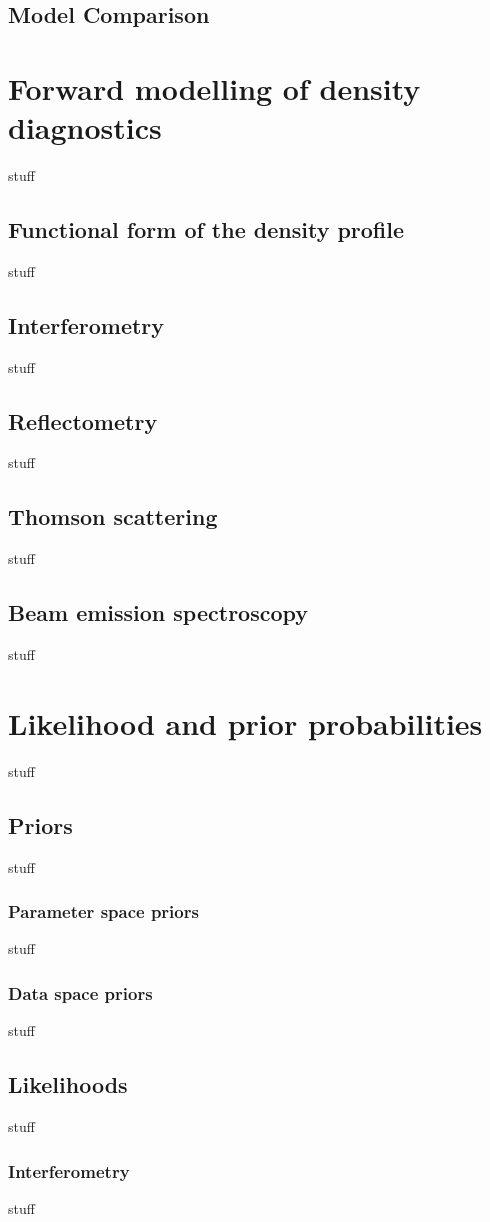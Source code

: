 \documentclass	[12pt]{article}
\begin{document}
\subsection{Model Comparison}

\section{Forward modelling of density diagnostics}
stuff
\subsection{Functional form of the density profile}
stuff
\subsection{Interferometry}
stuff
\subsection{Reflectometry}
stuff
\subsection{Thomson scattering}
stuff
\subsection{Beam emission spectroscopy}
stuff
\section{Likelihood and prior probabilities}
stuff
\subsection{Priors}
stuff
\subsubsection{Parameter space priors}
stuff
\subsubsection{Data space priors}
stuff
\subsection{Likelihoods}
stuff
\subsubsection{Interferometry}
stuff
\end{document}
